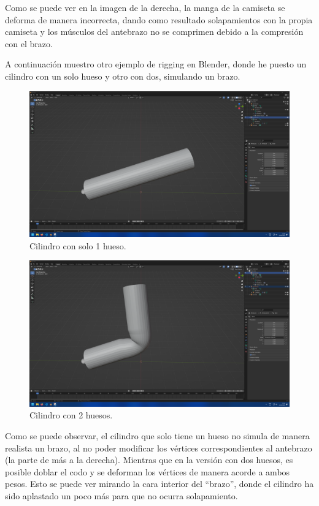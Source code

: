 \documentclass{article}
\begin{document}
Como se puede ver en la imagen de la derecha, la manga de la camiseta se deforma de manera incorrecta, dando como resultado solapamientos con la propia camiseta y los músculos del antebrazo no se comprimen debido a la compresión con el brazo.

\bigskip

A continuación muestro otro ejemplo de rigging en Blender, donde he puesto un cilindro con un solo hueso y otro con dos, simulando un brazo.

\begin{figure}[H]
   \centering
   \includegraphics[width=\textwidth]{imagenes/brazo1.png}
   \caption{Cilindro con solo 1 hueso.}
\end{figure}

\begin{figure}[H]
   \centering
   \includegraphics[width=\textwidth]{imagenes/brazo2.png}
   \caption{Cilindro con 2 huesos.}
\end{figure}

Como se puede observar, el cilindro que solo tiene un hueso no simula de manera realista un brazo, al no poder modificar los vértices correspondientes al antebrazo (la parte de más a la derecha). Mientras que en la versión con dos huesos, es posible doblar el codo y se deforman los vértices de manera acorde a ambos pesos. Esto se puede ver mirando la cara interior del ``brazo'', donde el cilindro ha sido aplastado un poco más para que no ocurra solapamiento.



\end{document}
